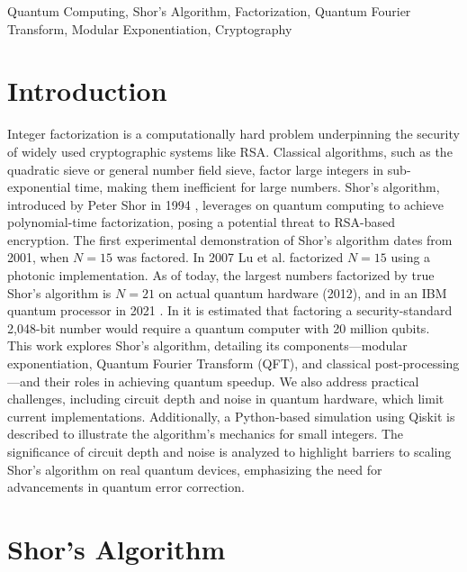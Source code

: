 \documentclass[conference,twoside]{IEEEtran}
\begin{document}
\begin{IEEEkeywords}
Quantum Computing, Shor's Algorithm, Factorization, Quantum Fourier Transform, Modular Exponentiation, Cryptography
\end{IEEEkeywords}

\section{Introduction}
Integer factorization is a computationally hard problem underpinning the security of widely used cryptographic systems like RSA. Classical algorithms, such as the quadratic sieve or general number field sieve, factor large integers in sub-exponential time, making them inefficient for large numbers. Shor's algorithm, introduced by Peter Shor in 1994 \citep*{shor1994}, leverages on quantum computing to achieve polynomial-time factorization, posing a potential threat to RSA-based encryption. The first experimental demonstration of Shor's algorithm dates from 2001\citep*{Vandersypen2001}, when $N=15$ was factored. In 2007 Lu et al.\citep*{Lu2007} factorized $N=15$ using a photonic implementation.  As of today, the largest numbers factorized by true Shor's algorithm is $N=21$ on actual quantum hardware (2012)\citep*{Martin-Lopez2012}, and in an IBM quantum processor in 2021 \citep*{Karamlou2021}. In \citep*{Gidney2021} it is estimated that factoring a security-standard 2,048-bit number would require a quantum computer with 20 million qubits.
\\
This work explores Shor's algorithm, detailing its components—modular exponentiation, Quantum Fourier Transform (QFT), and classical post-processing—and their roles in achieving quantum speedup. We also address practical challenges, including circuit depth and noise in quantum hardware, which limit current implementations. Additionally, a Python-based simulation using Qiskit\citep*{qiskit2023} is described to illustrate the algorithm's mechanics for small integers. The significance of circuit depth and noise is analyzed to highlight barriers to scaling Shor's algorithm on real quantum devices, emphasizing the need for advancements in quantum error correction.

\section{Shor's Algorithm}
\end{document}
